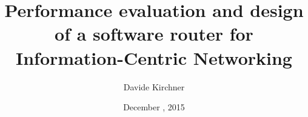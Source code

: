 
\usepackage{booktabs}
\usepackage[scale=2]{ccicons}

\usepackage{pgfplots}

\usepackage[vlined]{algorithm2e}
\newcommand{\monobig}[1]{\texttt{#1}}
\newcommand{\mono}[1]{{\footnotesize \ttfamily #1}}
\usepackage{comment}
\usepackage[super]{nth}
\usepackage{verbatim}
\usepackage{listings}
 \lstset{basicstyle=\footnotesize\ttfamily,frame=none}
\usepackage{tikz}
 \usetikzlibrary{positioning}
 \usetikzlibrary{calc}
 \usetikzlibrary{shapes.misc}
\usepackage{relsize}




\newcommand{\extraslidesbegin}{
  \newcounter{framenumbervorappendix}
  \setcounter{framenumbervorappendix}{\value{framenumber}}
}
\newcommand{\extraslidesend}{
  \addtocounter{framenumbervorappendix}{-\value{framenumber}}
  \addtocounter{framenumber}{\value{framenumbervorappendix}} 
}



\title{Performance evaluation and design of a software router for Information-Centric Networking}
\subtitle{}
\date{December , 2015}
\author{Davide Kirchner}

%




